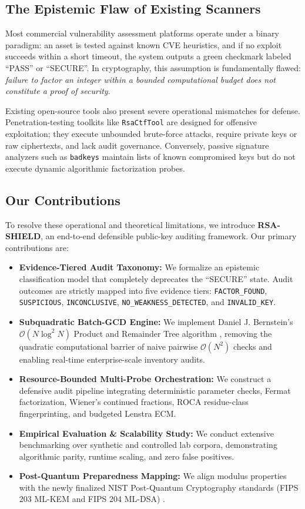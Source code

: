 \documentclass[sigconf,nonacm]{acmart}
\begin{document}
\subsection{The Epistemic Flaw of Existing Scanners}
Most commercial vulnerability assessment platforms operate under a binary paradigm: an asset is tested against known CVE heuristics, and if no exploit succeeds within a short timeout, the system outputs a green checkmark labeled ``PASS'' or ``SECURE''. In cryptography, this assumption is fundamentally flawed: \textit{failure to factor an integer within a bounded computational budget does not constitute a proof of security}. 

Existing open-source tools also present severe operational mismatches for defense. Penetration-testing toolkits like \texttt{RsaCtfTool} \cite{rsactftool} are designed for offensive exploitation; they execute unbounded brute-force attacks, require private keys or raw ciphertexts, and lack audit governance. Conversely, passive signature analyzers such as \texttt{badkeys} \cite{bock2022badkeys} maintain lists of known compromised keys but do not execute dynamic algorithmic factorization probes.

\subsection{Our Contributions}
To resolve these operational and theoretical limitations, we introduce \textbf{RSA-SHIELD}, an end-to-end defensible public-key auditing framework. Our primary contributions are:
\begin{itemize}
    \item \textbf{Evidence-Tiered Audit Taxonomy:} We formalize an epistemic classification model that completely deprecates the ``SECURE'' state. Audit outcomes are strictly mapped into five evidence tiers: \texttt{FACTOR\_FOUND}, \texttt{SUSPICIOUS}, \texttt{INCONCLUSIVE}, \texttt{NO\_WEAKNESS\_DETECTED}, and \texttt{INVALID\_KEY}.
    \item \textbf{Subquadratic Batch-GCD Engine:} We implement Daniel J. Bernstein's $\mathcal{O}(N \log^2 N)$ Product and Remainder Tree algorithm \cite{bernstein2004find}, removing the quadratic computational barrier of naive pairwise $\mathcal{O}(N^2)$ checks and enabling real-time enterprise-scale inventory audits.
    \item \textbf{Resource-Bounded Multi-Probe Orchestration:} We construct a defensive audit pipeline integrating deterministic parameter checks, Fermat factorization, Wiener's continued fractions, ROCA residue-class fingerprinting, and budgeted Lenstra ECM.
    \item \textbf{Empirical Evaluation \& Scalability Study:} We conduct extensive benchmarking over synthetic and controlled lab corpora, demonstrating algorithmic parity, runtime scaling, and zero false positives.
    \item \textbf{Post-Quantum Preparedness Mapping:} We align modulus properties with the newly finalized NIST Post-Quantum Cryptography standards (FIPS 203 ML-KEM and FIPS 204 ML-DSA) \cite{nist2024fips203, nist2024fips204}.
\end{itemize}
\end{document}
